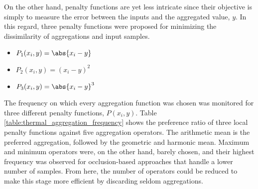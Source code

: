 On the other hand, penalty functions are yet less intricate since their objective is simply to measure the error between the inputs and the aggregated value, $y$. In this regard, three penalty functions \cite{paternain_color_2012} were proposed for minimizing the dissimilarity of aggregations and input samples. 
\begin{itemize}
    \setlength\itemsep{0.5em}
    \item $P_1(x_i, y) = \abs{x_i - y}$
    \item $P_2(x_i, y) = (x_i - y)^2$
    \item $P_3(x_i, y) = \abs{x_i - y}^3$
\end{itemize}

The frequency on which every aggregation function was chosen was monitored for three different penalty functions, $P(x_i, y)$. Table \ref{table:thermal_aggregation_frequency} shows the preference ratio of three local penalty functions against five aggregation operators. The arithmetic mean is the preferred aggregation, followed by the geometric and harmonic mean. Maximum and minimum operators were, on the other hand, barely chosen, and their highest frequency was observed for occlusion-based approaches that handle a lower number of samples. From here, the number of operators could be reduced to make this stage more efficient by discarding seldom aggregations.

